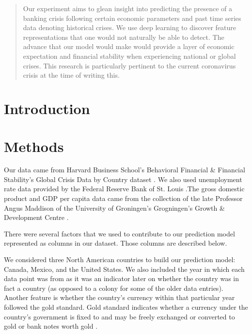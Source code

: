 \documentclass[12pt]{article}
\begin{document}
\maketitle

\begin{abstract}
Our experiment aims to glean insight into predicting the presence of a banking crisis following certain economic parameters and past time series data denoting historical crises. We use deep learning to discover feature representations that one would not naturally be able to detect. The advance that our model would make would provide a layer of economic expectation and financial stability when experiencing national or global crises. This research is particularly pertinent to the current coronavirus crisis at the time of writing this.
\end{abstract}


\section{Introduction}

\section{Methods}
Our data came from Harvard Business School’s Behavioral Financial & Financial Stability’s Global Crisis Data by Country dataset \cite{harvard}. We also used unemployment rate data provided by the Federal Reserve Bank of St. Louis \cite{fred}.The gross domestic product and GDP per capita data came from the collection of the late Professor Angus Maddison of the University of Groningen’s Grogningen’s Growth & Development Centre \cite{ggdc}.

There were several factors that we used to contribute to our prediction model represented as columns in our dataset. Those columns are described below.

We considered three North American countries to build our prediction model: Canada, Mexico, and the United States. We also included the year in which each data point was from as it was an indicator later on whether the country was in fact a country (as opposed to a colony for some of the older data entries). 
Another feature is whether the country’s currency within that particular year followed the gold standard. Gold standard indicates whether a currency under the country’s government is fixed to and may be freely exchanged or converted to gold or bank notes worth gold \cite{chengold}.
\end{document}
